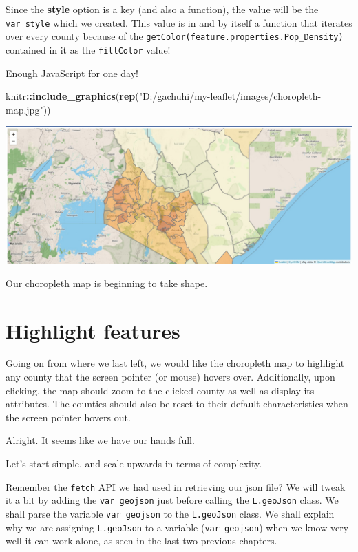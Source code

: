 \documentclass[
]{book}
\newenvironment{Shaded}{\begin{snugshade}}{\end{snugshade}}
\newcommand{\FunctionTok}[1]{\textcolor[rgb]{0.13,0.29,0.53}{\textbf{#1}}}
\newcommand{\NormalTok}[1]{#1}
\newcommand{\SpecialCharTok}[1]{\textcolor[rgb]{0.81,0.36,0.00}{\textbf{#1}}}
\newcommand{\StringTok}[1]{\textcolor[rgb]{0.31,0.60,0.02}{#1}}
\begin{document}
Since the \textbf{style} option is a key (and also a function), the value will be the \texttt{var\ style} which we created. This value is in and by itself a function that iterates over every county because of the \texttt{getColor(feature.properties.Pop\_Density)} contained in it as the \texttt{fillColor} value!

Enough JavaScript for one day!

\begin{Shaded}
\begin{Highlighting}[]
\NormalTok{knitr}\SpecialCharTok{::}\FunctionTok{include\_graphics}\NormalTok{(}\FunctionTok{rep}\NormalTok{(}\StringTok{"D:/gachuhi/my{-}leaflet/images/choropleth{-}map.jpg"}\NormalTok{))}
\end{Highlighting}
\end{Shaded}

\includegraphics{../images/choropleth-map.jpg}

Our choropleth map is beginning to take shape.

\hypertarget{highlight-features}{%
\section{Highlight features}\label{highlight-features}}

Going on from where we last left, we would like the choropleth map to highlight any county that the screen pointer (or mouse) hovers over. Additionally, upon clicking, the map should zoom to the clicked county as well as display its attributes. The counties should also be reset to their default characteristics when the screen pointer hovers out.

Alright. It seems like we have our hands full.

Let's start simple, and scale upwards in terms of complexity.

Remember the \texttt{fetch} API we had used in retrieving our json file? We will tweak it a bit by adding the \texttt{var\ geojson} just before calling the \texttt{L.geoJson} class. We shall parse the variable \texttt{var\ geojson} to the \texttt{L.geoJson} class. We shall explain why we are assigning \texttt{L.geoJson} to a variable (\texttt{var\ geojson}) when we know very well it can work alone, as seen in the last two previous chapters.
\end{document}
